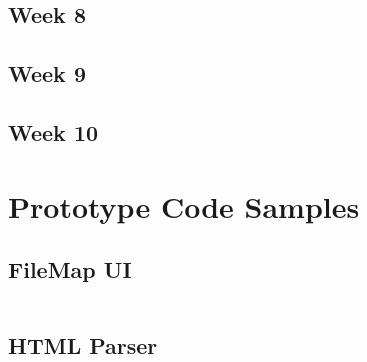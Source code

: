 \documentclass[letterpaper,10pt,titlepage,draftclsnofoot,onecolumn,onesided] {IEEEtran}
\begin{document}
	\subsection{Week 8}

	\subsection{Week 9}

	\subsection{Week 10}

\section{Prototype Code Samples}
	
	\subsection{FileMap UI}
	\begin{lstlisting}

	\end{lstlisting}

	\subsection{HTML Parser}
	\begin{lstlisting}

	\end{lstlisting}
\end{document}
